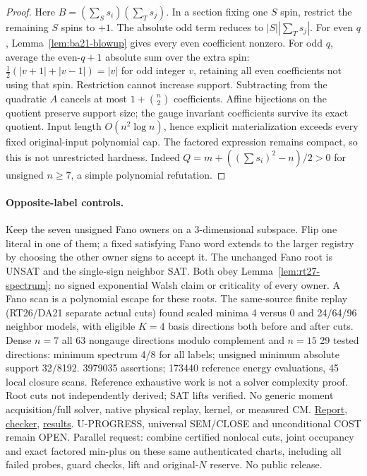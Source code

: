 \documentclass[11pt]{article}
\begin{document}
\begin{proof}
Here $B=(\sum_S s_i)(\sum_T s_j)$. In a section fixing one $S$ spin, restrict the remaining $S$ spins to $+1$. The absolute odd term reduces to $|S||\sum_T s_j|$. For even $q$, Lemma~\ref{lem:ba21-blowup} gives every even coefficient nonzero. For odd $q$, average the even-$q+1$ absolute sum over the extra spin: $\frac12(|v+1|+|v-1|)=|v|$ for odd integer $v$, retaining all even coefficients not using that spin. Restriction cannot increase support. Subtracting from the quadratic $A$ cancels at most $1+\binom n2$ coefficients. Affine bijections on the quotient preserve support size; the gauge invariant coefficients survive its exact quotient. Input length $O(n^2\log n)$, hence explicit materialization exceeds every fixed original-input polynomial cap. The factored expression remains compact, so this is not unrestricted hardness. Indeed $Q=m+((\sum s_i)^2-n)/2>0$ for unsigned $n\ge7$, a simple polynomial refutation.
\end{proof}
\paragraph{Opposite-label controls.} Keep the seven unsigned Fano owners on a 3-dimensional subspace. Flip one literal in one of them; a fixed satisfying Fano word extends to the larger registry by choosing the other owner signs to accept it. The unchanged Fano root is UNSAT and the single-sign neighbor SAT. Both obey Lemma~\ref{lem:rt27-spectrum}; no signed exponential Walsh claim or criticality of every owner. A Fano scan is a polynomial escape for these roots. The same-source finite replay (RT26/DA21 separate actual cuts) found scaled minima 4 versus 0 and 24/64/96 neighbor models, with eligible $K=4$ basis directions both before and after cuts. Dense $n=7$ all 63 nongauge directions modulo complement and $n=15$ 29 tested directions: minimum spectrum 4/8 for all labels; unsigned minimum absolute support 32/8192. 3979035 assertions; 173440 reference energy evaluations, 45 local closure scans. Reference exhaustive work is not a solver complexity proof. Root cuts not independently derived; SAT lifts verified. No generic moment acquisition/full solver, native physical replay, kernel, or measured CM. \href{https://github.com/j15marti/pnp/commit/9e1321aab3786ef229a46ae50e82f3d3f7d786a6}{Report}, \href{https://github.com/j15marti/pnp/commit/0d0ab75cc66ae0954d680552ef4a46211dd640d8}{checker}, \href{https://github.com/j15marti/pnp/commit/d5361e54fd9e43be08a977b503206165ebcbc30b}{results}. U-PROGRESS, universal SEM/CLOSE and unconditional COST remain OPEN. Parallel request: combine certified nonlocal cuts, joint occupancy and exact factored min-plus on these same authenticated charts, including all failed probes, guard checks, lift and original-$N$ reserve. No public release.
\end{document}

